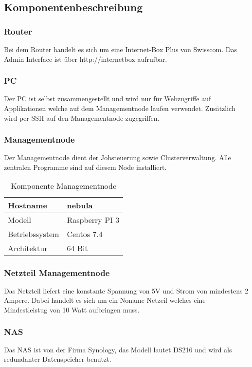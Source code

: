 \subsection{Komponentenbeschreibung}
\subsubsection{Router}

Bei dem Router handelt es sich um eine Internet-Box Plus von Swisscom. Das Admin Interface ist über http://internetbox aufrufbar.

\subsubsection{PC}
Der PC ist selbst zusammengestellt und wird nur für Webzugriffe auf Applikationen welche auf dem Managementnode laufen verwendet. Zusätzlich wird per SSH auf den Managementnode zugegriffen.

\subsubsection{Managementnode}
Der Managementnode dient der Jobsteuerung sowie Clusterverwaltung. Alle zentralen Programme sind auf diesem Node installiert.

\begin{table}[H]
\centering
\begin{tabular}{|l|l|}
\hline
Hostname & nebula \\\hline
Modell & Raspberry PI 3 \\\hline
Betriebssystem & Centos 7.4 \\\hline
Architektur & 64 Bit \\\hline
\end{tabular}
\caption{Komponente Managementnode}
\end{table}

\subsubsection{Netzteil Managementnode}
Das Netzteil liefert eine konstante Spannung von 5V und Strom von mindestens 2 Ampere. Dabei handelt es sich um ein Noname Netzeil welches eine Mindestleistug von 10 Watt aufbringen muss.

\subsubsection{NAS}
Das NAS ist von der Firma Synology, das Modell lautet DS216 und wird als redundanter Datenspeicher benutzt.

